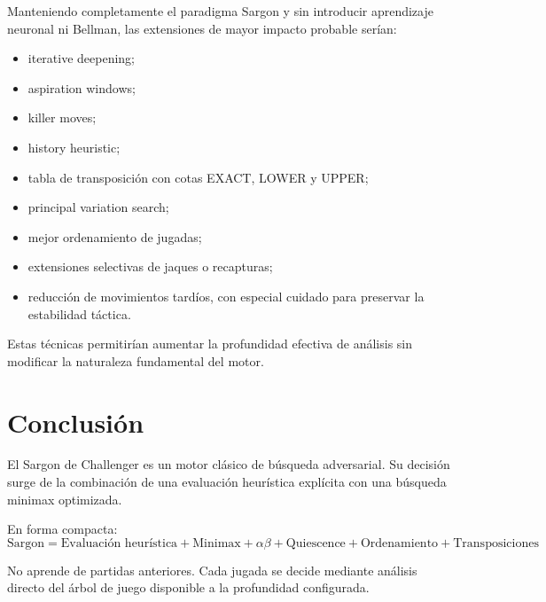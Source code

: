\documentclass[11pt,a4paper]{article}
\begin{document}
Manteniendo completamente el paradigma Sargon y sin introducir aprendizaje
neuronal ni Bellman, las extensiones de mayor impacto probable serían:

\begin{itemize}
    \item iterative deepening;
    \item aspiration windows;
    \item killer moves;
    \item history heuristic;
    \item tabla de transposición con cotas EXACT, LOWER y UPPER;
    \item principal variation search;
    \item mejor ordenamiento de jugadas;
    \item extensiones selectivas de jaques o recapturas;
    \item reducción de movimientos tardíos, con especial cuidado para preservar
    la estabilidad táctica.
\end{itemize}

Estas técnicas permitirían aumentar la profundidad efectiva de análisis sin
modificar la naturaleza fundamental del motor.

\section{Conclusión}

El Sargon de Challenger es un motor clásico de búsqueda adversarial. Su decisión
surge de la combinación de una evaluación heurística explícita con una búsqueda
minimax optimizada.

En forma compacta:
\[
\boxed{
\text{Sargon}
=
\text{Evaluación heurística}
+
\text{Minimax}
+
\alpha\beta
+
\text{Quiescence}
+
\text{Ordenamiento}
+
\text{Transposiciones}
}
\]

No aprende de partidas anteriores. Cada jugada se decide mediante análisis
directo del árbol de juego disponible a la profundidad configurada.
\end{document}
